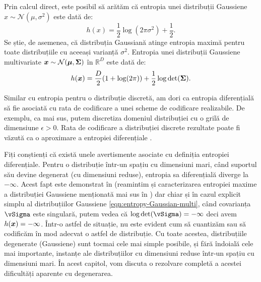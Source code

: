 \documentclass[../../book-main_ro.tex]{subfiles}
\begin{document}
\begin{example}
	Prin calcul direct, este posibil să arătăm că entropia unei distribuții Gaussiene $x \sim \mathcal{N}(\mu, \sigma^2)$ este dată de:
	\begin{equation}
		h(x) = \frac{1}{2}\log (2\pi \sigma^2) + \frac{1}{2}.
		\label{eqn:entropy-Gaussian}
	\end{equation}
	Se știe, de asemenea, că distribuția Gaussiană atinge entropia maximă
	pentru toate distribuțiile cu aceeași varianță $\sigma^2$. Entropia unei distribuții Gaussiene multivariate $\bm{x} \sim \mathcal{N}(\boldsymbol{\mu}, \boldsymbol{\Sigma})$ în $\mathbb{R}^D$ este dată de:
	\begin{equation}
		h(\bm{x}) = \frac{D}{2}(1 + \log(2\pi)) + \frac{1}{2}\log\det(\boldsymbol{\Sigma}).
		\label{eqn:entropy-Gaussian-multi}
	\end{equation}
\end{example}

Similar cu entropia pentru o distribuție discretă, am dori ca entropia
diferențială să fie asociată cu rata de codificare a unei scheme de codificare realizabile. De exemplu, ca mai sus, putem discretiza domeniul distribuției cu o grilă de dimensiune $\epsilon >0$. Rata de codificare a distribuției discrete rezultate poate fi văzută ca o aproximare a entropiei diferențiale \cite{Cover-Thomas}.

Fiți conștienți că există unele avertismente asociate cu definiția entropiei
diferențiale. Pentru o distribuție într-un spațiu cu dimensiuni mari, când suportul său devine degenerat (cu dimensiuni reduse), entropia sa diferențială diverge la \(-\infty\). Acest fapt este demonstrat în
 (reamintim și caracterizarea entropiei maxime a distribuției Gaussiene menționată mai sus în ) dar chiar și în cazul explicit simplu al distribuțiilor Gaussiene \eqref{eqn:entropy-Gaussian-multi}, când covarianța \(\vSigma\) este singulară, putem vedea că \(\log\det(\vSigma) = -\infty\) deci avem $h(\bm{x}) = -\infty$. Într-o astfel de situație, nu este evident cum să cuantizăm sau să codificăm în mod adecvat o astfel de distribuție. Cu toate acestea, distribuțiile degenerate (Gaussiene) sunt tocmai cele mai simple posibile, și fără îndoială cele mai importante, instanțe ale distribuțiilor cu dimensiuni reduse într-un spațiu cu dimensiuni mari. În acest capitol, vom discuta o rezolvare completă a acestei dificultăți aparente cu degenerarea.
\end{document}
